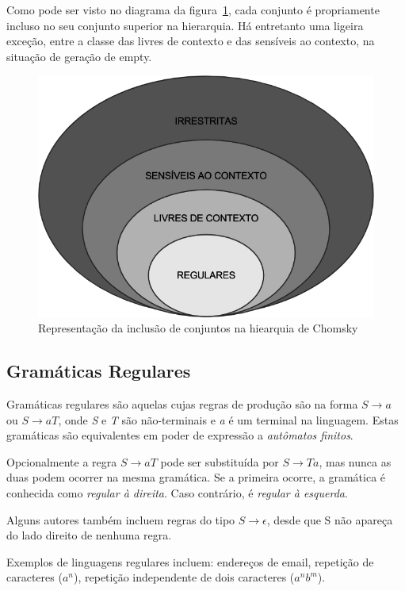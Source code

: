 \documentclass[a4paper,12pt,oneside,onecolumn]{uerj}
\begin{document}
Como pode ser visto no diagrama da figura~\ref{fig:chomsky}, cada conjunto é propriamente incluso no seu conjunto superior na hierarquia. Há entretanto uma ligeira exceção, entre a classe das livres de contexto e das sensíveis ao contexto, na situação de geração de empty.

\begin{figure}[ht]
  \centering
  \includegraphics[scale=0.5]{figures/chomsky.png}
  \caption{Representação da inclusão de conjuntos na hiearquia de Chomsky}
  \label{fig:chomsky}
\end{figure}

\subsection{Gramáticas Regulares}

Gramáticas regulares são aquelas cujas regras de produção são na forma $S \rightarrow a$ ou $S \rightarrow aT$, onde \emph{S} e \emph{T} são não-terminais e \emph{a} é um terminal na linguagem. Estas gramáticas são equivalentes em poder de expressão a \emph{autômatos finitos}. 

Opcionalmente a regra $S \rightarrow aT$ pode ser substituída por $S \rightarrow Ta$, mas nunca as duas podem ocorrer na mesma gramática. Se a primeira ocorre, a gramática é conhecida como \emph{regular à direita}. Caso contrário, é \emph{regular à esquerda}.

Alguns autores também incluem regras do tipo $S \rightarrow \epsilon$, desde que S não apareça do lado direito de nenhuma regra.

Exemplos de linguagens regulares incluem: endereços de email, repetição de caracteres ($a^n$), repetição independente de dois caracteres ($a^nb^m$).
\end{document}
